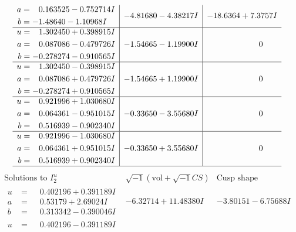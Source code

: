 \documentclass[1p]{elsarticle_modified}
\theoremstyle{definition}
\newcommand{\I}{\sqrt{-1}}
\begin{document}
$$\begin{array}{c|c|c}
\begin{aligned}
a &= \phantom{-}0.163525 - 0.752714 I \\
b &= -1.48640 - 1.10968 I\end{aligned}
 & -4.81680 - 4.38217 I & -18.6364 + 7.3757 I \\ \hline\begin{aligned}
u &= \phantom{-}1.302450 + 0.398915 I \\
a &= \phantom{-}0.087086 - 0.479726 I \\
b &= -0.278274 - 0.910565 I\end{aligned}
 & -1.54665 - 1.19900 I & \phantom{-0.000000 } 0 \\ \hline\begin{aligned}
u &= \phantom{-}1.302450 - 0.398915 I \\
a &= \phantom{-}0.087086 + 0.479726 I \\
b &= -0.278274 + 0.910565 I\end{aligned}
 & -1.54665 + 1.19900 I & \phantom{-0.000000 } 0 \\ \hline\begin{aligned}
u &= \phantom{-}0.921996 + 1.030680 I \\
a &= \phantom{-}0.064361 - 0.951015 I \\
b &= \phantom{-}0.516939 - 0.902340 I\end{aligned}
 & -0.33650 - 3.55680 I & \phantom{-0.000000 } 0 \\ \hline\begin{aligned}
u &= \phantom{-}0.921996 - 1.030680 I \\
a &= \phantom{-}0.064361 + 0.951015 I \\
b &= \phantom{-}0.516939 + 0.902340 I\end{aligned}
 & -0.33650 + 3.55680 I & \phantom{-0.000000 } 0\\
 \hline 
 \end{array}$$\newpage$$\begin{array}{c|c|c}  
\text{Solutions to }I^u_{2}& \I (\text{vol} + \sqrt{-1}CS) & \text{Cusp shape}\\
 \hline 
\begin{aligned}
u &= \phantom{-}0.402196 + 0.391189 I \\
a &= \phantom{-}0.53179 + 2.69024 I \\
b &= \phantom{-}0.313342 - 0.390046 I\end{aligned}
 & -6.32714 + 11.48380 I & -3.80151 - 6.75688 I \\ \hline\begin{aligned}
u &= \phantom{-}0.402196 - 0.391189 I \\

\end{aligned}
\end{array}$$
\end{document}

